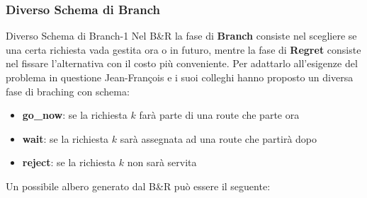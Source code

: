 \documentclass[10pt]{beamer}
\begin{document}
    \subsubsection{Diverso Schema di Branch}\label{sec:b-and-r-branchschema}
    \begin{frame}{Diverso Schema di Branch-1}
        Nel B\&R la fase di \textbf{Branch} consiste nel scegliere se una certa richiesta vada gestita ora o in futuro, mentre la fase di \textbf{Regret} consiste nel fissare l'alternativa con il costo più conveniente. Per adattarlo all'esigenze del problema in questione Jean-François e i suoi colleghi hanno proposto un diversa fase di braching con schema:
        \begin{itemize}
            \item \textbf{go\_now}: se la richiesta {\(k\)} farà parte di una route che parte ora
            \item \textbf{wait}: se la richiesta {\(k\)} sarà assegnata ad una route che partirà dopo
            \item \textbf{reject}: se la richiesta {\(k\)} non sarà servita
        \end{itemize}
         Un possibile albero generato dal B\&R può essere il seguente:
    \end{frame}
\end{document}
